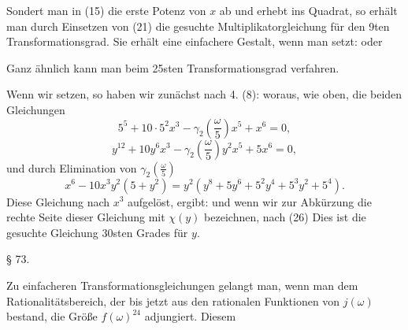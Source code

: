 Sondert man in (15) die erste Potenz von $x$ ab und erhebt ins
Quadrat, so erhält man durch Einsetzen von (21) die gesuchte
Multiplikatorgleichung für den 9ten Transformationsgrad. Sie erhält
eine einfachere Gestalt, wenn man
setzt:
oder

Ganz ähnlich kann man beim 25sten Transformationsgrad verfahren.

Wenn wir
setzen, so haben wir zunächst nach 4. (8):
woraus, wie oben, die beiden Gleichungen
\[
5^5 + 10\cdot5^2x^3 - \gamma_2\left(\frac{\omega}{5}\right)x^5 + x^6 = 0,
\]
\[
y^{12} + 10y^6x^3 - \gamma_2\left(\frac{\omega}{5}\right)y^2x^5 + 5x^6 = 0,
\]
und durch Elimination von $\gamma_2\left(\frac{\omega}{5}\right)$
\[
x^6 - 10x^3y^2(5+y^2) = y^2(y^8 + 5y^6 + 5^2y^4 + 5^3y^2 + 5^4).
\]
Diese Gleichung nach $x^3$ aufgelöst, ergibt:
und wenn wir zur Abkürzung die rechte Seite dieser Gleichung mit
$\chi(y)$ bezeichnen, nach (26)
Dies ist die gesuchte Gleichung 30sten Grades für $y$.

\begin{center}
§ 73.\quad {}
\end{center}

Zu einfacheren Transformationsgleichungen gelangt man, wenn man dem
Rationalitätsbereich, der bis jetzt aus den rationalen Funktionen von
$j(\omega)$ bestand, die Größe $f(\omega)^{24}$ adjungiert. Diesem

